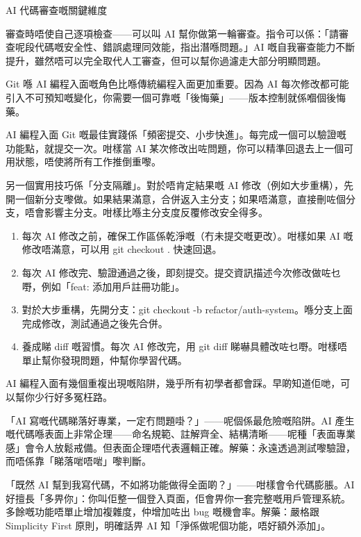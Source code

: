 \begin{center}\small\color{gray}AI 代碼審查嘅關鍵維度\end{center}

審查時唔使自己逐項檢查——可以叫 AI 幫你做第一輪審查。指令可以係：「請審查呢段代碼嘅安全性、錯誤處理同效能，指出潛喺問題。」AI 嘅自我審查能力不斷提升，雖然唔可以完全取代人工審查，但可以幫你過濾走大部分明顯問題。


Git 喺 AI 編程入面嘅角色比喺傳統編程入面更加重要。因為 AI 每次修改都可能引入不可預知嘅變化，你需要一個可靠嘅「後悔藥」——版本控制就係嗰個後悔藥。

AI 編程入面 Git 嘅最佳實踐係「頻密提交、小步快進」。每完成一個可以驗證嘅功能點，就提交一次。咁樣當 AI 某次修改出咗問題，你可以精準回退去上一個可用狀態，唔使將所有工作推倒重嚟。

另一個實用技巧係「分支隔離」。對於唔肯定結果嘅 AI 修改（例如大步重構），先開一個新分支嚟做。如果結果滿意，合併返入主分支；如果唔滿意，直接刪咗個分支，唔會影響主分支。咁樣比喺主分支度反覆修改安全得多。

\begin{enumerate}
  \item 每次 AI 修改之前，確保工作區係乾淨嘅（冇未提交嘅更改）。咁樣如果 AI 嘅修改唔滿意，可以用 git checkout . 快速回退。
  \item 每次 AI 修改完、驗證通過之後，即刻提交。提交資訊描述今次修改做咗乜嘢，例如「feat: 添加用戶註冊功能」。
  \item 對於大步重構，先開分支：git checkout -b refactor/auth-system。喺分支上面完成修改，測試通過之後先合併。
  \item 養成睇 diff 嘅習慣。每次 AI 修改完，用 git diff 睇嚇具體改咗乜嘢。咁樣唔單止幫你發現問題，仲幫你學習代碼。
\end{enumerate}


AI 編程入面有幾個重複出現嘅陷阱，幾乎所有初學者都會踩。早啲知道佢哋，可以幫你少行好多冤枉路。


「AI 寫嘅代碼睇落好專業，一定冇問題啩？」——呢個係最危險嘅陷阱。AI 產生嘅代碼喺表面上非常企理——命名規範、註解齊全、結構清晰——呢種「表面專業感」會令人放鬆戒備。但表面企理唔代表邏輯正確。解藥：永遠透過測試嚟驗證，而唔係靠「睇落啱唔啱」嚟判斷。


「既然 AI 幫到我寫代碼，不如將功能做得全面啲？」——咁樣會令代碼膨脹。AI 好擅長「多畀你」：你叫佢整一個登入頁面，佢會畀你一套完整嘅用戶管理系統。多餘嘅功能唔單止增加複雜度，仲增加咗出 bug 嘅機會率。解藥：嚴格跟 Simplicity First 原則，明確話畀 AI 知「淨係做呢個功能，唔好額外添加」。

